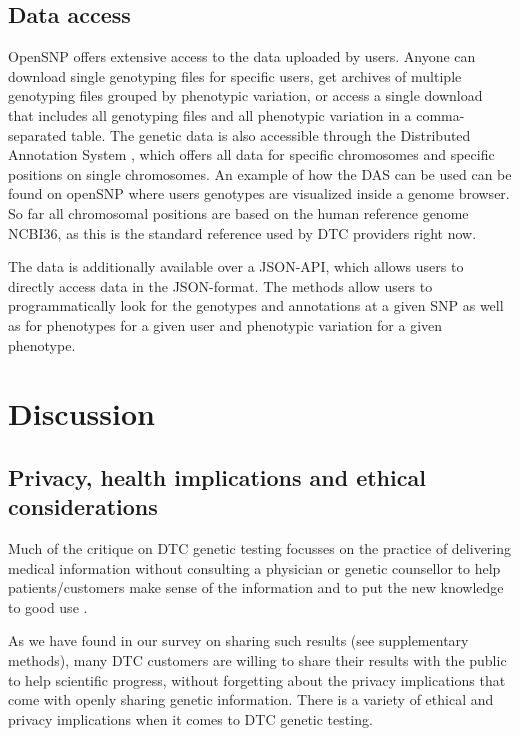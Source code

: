 \documentclass[10pt]{article}
\newcommand{\bastian}[1]{\authornote{BG: #1}}
\begin{document}
\subsection*{Data access}
OpenSNP offers extensive access to the data uploaded by users. Anyone can download single genotyping files for specific users, get archives of multiple genotyping files 
grouped by phenotypic variation, or access a single download that includes all genotyping files and all phenotypic variation in a comma-separated table. The genetic data is also 
accessible through the Distributed Annotation System \cite{Dowell2001,Jenkinson2008}, which offers all data for specific chromosomes and specific positions on single chromosomes. 
An example of how the DAS can be used can be found on openSNP where users genotypes are visualized inside a genome browser. So far all chromosomal positions are based on the human reference genome NCBI36, as this is the standard reference used by DTC providers right now. \bastian{should this maybe include an image as well?}

The data is additionally available over a JSON-API, which allows users to directly access data in the JSON-format. The methods allow users to programmatically look for the genotypes and annotations at a given SNP as well as for phenotypes for a given user and phenotypic variation for a given phenotype.
\section*{Discussion}

\subsection*{Privacy, health implications and ethical considerations}

Much of the critique on DTC genetic testing focusses on the practice 
of delivering medical information without consulting a physician or genetic counsellor to help patients/customers make sense of the information 
and to put the new knowledge to good use \cite{Hauskeller2011,Hogarth2008,Wasson2009}.  

As we have found in our survey on sharing such results (see supplementary methods), many DTC customers are willing to share their results with the public to help scientific progress, without forgetting about the privacy implications that come with openly sharing genetic information. There is a variety of ethical and privacy implications when it comes to DTC genetic testing\cite{Caulfield2011,Joh2011}. 
\end{document}
